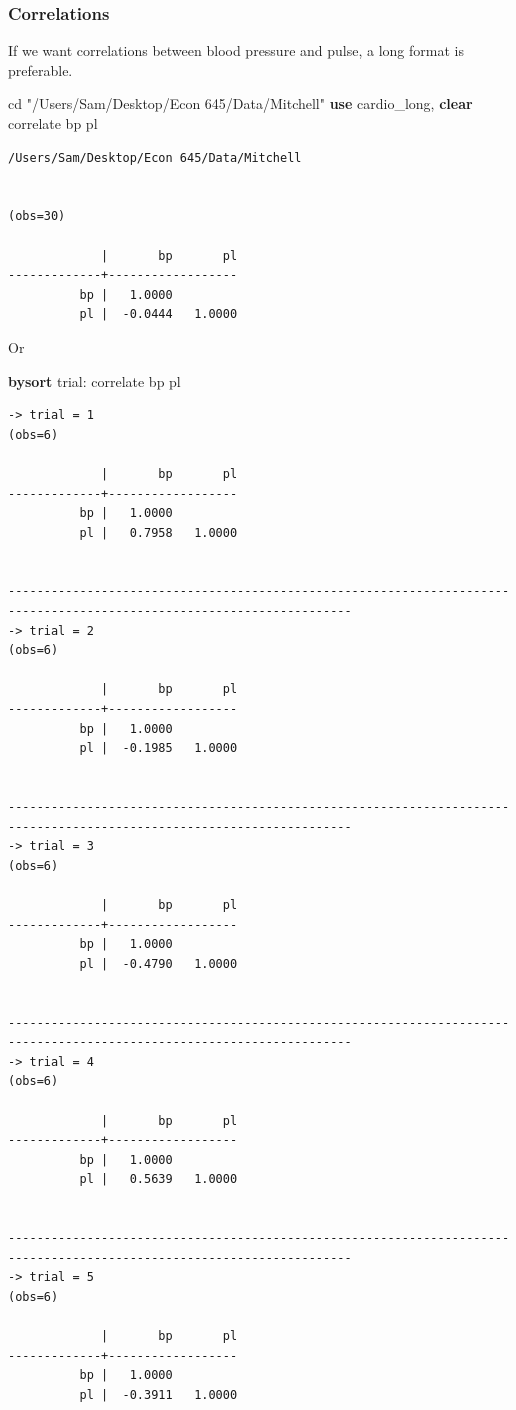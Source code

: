 \documentclass[
]{book}
\newenvironment{Shaded}{\begin{snugshade}}{\end{snugshade}}
\newcommand{\KeywordTok}[1]{\textcolor[rgb]{0.13,0.29,0.53}{\textbf{#1}}}
\newcommand{\NormalTok}[1]{#1}
\newcommand{\StringTok}[1]{\textcolor[rgb]{0.31,0.60,0.02}{#1}}
\begin{document}
\subsubsection*{Correlations}\label{correlations}

If we want correlations between blood pressure and pulse, a long format is preferable.

\begin{Shaded}
\begin{Highlighting}[]
\NormalTok{cd }\StringTok{"/Users/Sam/Desktop/Econ 645/Data/Mitchell"}
\KeywordTok{use}\NormalTok{ cardio\_long, }\KeywordTok{clear}
\NormalTok{correlate bp pl}
\end{Highlighting}
\end{Shaded}

\begin{verbatim}
/Users/Sam/Desktop/Econ 645/Data/Mitchell


(obs=30)

             |       bp       pl
-------------+------------------
          bp |   1.0000
          pl |  -0.0444   1.0000
\end{verbatim}

Or

\begin{Shaded}
\begin{Highlighting}[]
\KeywordTok{bysort}\NormalTok{ trial: correlate bp pl}
\end{Highlighting}
\end{Shaded}

\begin{verbatim}
-> trial = 1
(obs=6)

             |       bp       pl
-------------+------------------
          bp |   1.0000
          pl |   0.7958   1.0000


----------------------------------------------------------------------------------------------------------------------
-> trial = 2
(obs=6)

             |       bp       pl
-------------+------------------
          bp |   1.0000
          pl |  -0.1985   1.0000


----------------------------------------------------------------------------------------------------------------------
-> trial = 3
(obs=6)

             |       bp       pl
-------------+------------------
          bp |   1.0000
          pl |  -0.4790   1.0000


----------------------------------------------------------------------------------------------------------------------
-> trial = 4
(obs=6)

             |       bp       pl
-------------+------------------
          bp |   1.0000
          pl |   0.5639   1.0000


----------------------------------------------------------------------------------------------------------------------
-> trial = 5
(obs=6)

             |       bp       pl
-------------+------------------
          bp |   1.0000
          pl |  -0.3911   1.0000
\end{verbatim}
\end{document}
